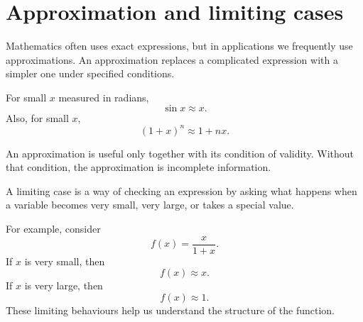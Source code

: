 \section{Approximation and limiting cases}

Mathematics often uses exact expressions, but in applications we frequently use approximations. An approximation replaces a complicated expression with a simpler one under specified conditions.

For small \(x\) measured in radians,
\[
\sin x \approx x.
\]
Also, for small \(x\),
\[
(1+x)^n \approx 1+nx.
\]

\begin{remarkbox}
An approximation is useful only together with its condition of validity. Without that condition, the approximation is incomplete information.
\end{remarkbox}

A limiting case is a way of checking an expression by asking what happens when a variable becomes very small, very large, or takes a special value.

For example, consider
\[
f(x)=\frac{x}{1+x}.
\]
If \(x\) is very small, then
\[
f(x)\approx x.
\]
If \(x\) is very large, then
\[
f(x)\approx 1.
\]
These limiting behaviours help us understand the structure of the function.
